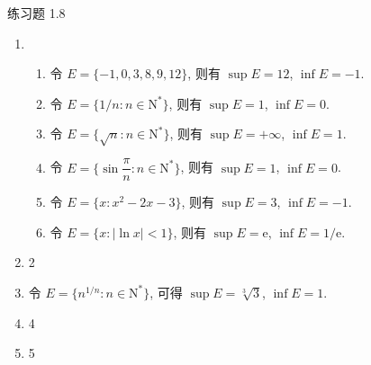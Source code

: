 \documentclass[12pt]{article}
\begin{document}
\pagestyle{empty}

\begin{center}
    {\heiti 练习题 1.8}
\end{center}

\begin{enumerate}
    \item 
        \begin{enumerate}[(1)]
            \item 令 $E = \{-1, 0, 3, 8, 9, 12\}$, 则有 $\sup E = 12$, $\inf E = -1$.
            \item 令 $E = \{1/n: n \in \mathrm{N}^*\}$, 则有 $\sup E = 1$, $\inf E = 0$.
            \item 令 $E = \{\sqrt{n}: n \in \mathrm{N}^*\}$, 则有 $\sup E = +\infty$, $\inf E = 1$.
            \item 令 $E = \{\sin\dfrac{\pi}{n}: n \in \mathrm{N}^*\}$, 则有 $\sup E = 1$, $\inf E = 0$.
            \item 令 $E = \{x: x^2 - 2x - 3\}$, 则有 $\sup E = 3$, $\inf E = -1$.
            \item 令 $E = \{x: |\ln x| < 1\}$, 则有 $\sup E = \mathrm{e}$, $\inf E = 1/\mathrm{e}$.
        \end{enumerate}
    \item 2
    \item 令 $E = \{ n^{1/n}: n\in\mathrm{N}^* \}$, 可得 $\sup E = \sqrt[3]{3}$, $\inf E = 1$.
    \item 4
    \item 5
\end{enumerate}
\end{document}
